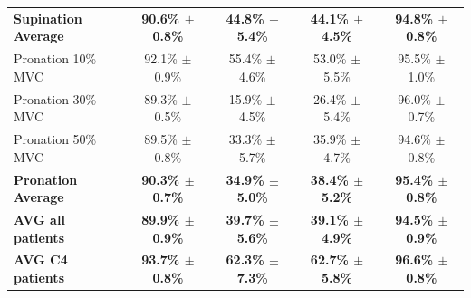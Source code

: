 \begin{table}[]
\begin{tabular}{lcccc}
\textbf{Supination Average} & \textbf{90.6\% $\pm$ 0.8\%} & \textbf{44.8\% $\pm$ 5.4\%} & \textbf{44.1\% $\pm$ 4.5\%} & \textbf{94.8\% $\pm$ 0.8\%} \\
Pronation 10\% MVC        & 92.1\% $\pm$ 0.9\%          & 55.4\% $\pm$ 4.6\%          & 53.0\% $\pm$ 5.5\%          & 95.5\% $\pm$ 1.0\%          \\
Pronation 30\% MVC        & 89.3\% $\pm$ 0.5\%          & 15.9\% $\pm$ 4.5\%          & 26.4\% $\pm$ 5.4\%          & 96.0\% $\pm$ 0.7\%          \\
Pronation 50\% MVC        & 89.5\% $\pm$ 0.8\%          & 33.3\% $\pm$ 5.7\%          & 35.9\% $\pm$ 4.7\%          & 94.6\% $\pm$ 0.8\%          \\
\textbf{Pronation Average}  & \textbf{90.3\% $\pm$ 0.7\%} & \textbf{34.9\% $\pm$ 5.0\%} & \textbf{38.4\% $\pm$ 5.2\%} & \textbf{95.4\% $\pm$ 0.8\%} \\ \hline \hline
\textbf{AVG all patients} & \textbf{89.9\% $\pm$ 0.9\%} & \textbf{39.7\% $\pm$ 5.6\%} & \textbf{39.1\% $\pm$ 4.9\%} & \textbf{94.5\% $\pm$ 0.9\%} \\
\textbf{AVG C4 patients}  & \textbf{93.7\% $\pm$ 0.8\%} & \textbf{62.3\% $\pm$ 7.3\%} & \textbf{62.7\% $\pm$ 5.8\%} & \textbf{96.6\% $\pm$ 0.8\%}
\end{tabular}
\end{table}


